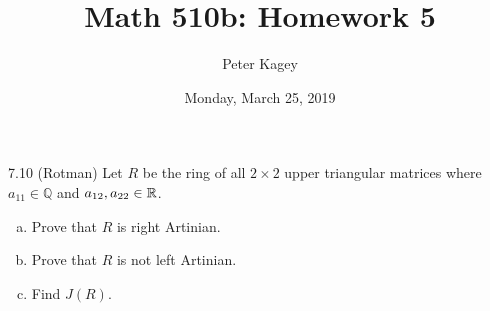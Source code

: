 \documentclass{article}
\begin{document}
\title{Math 510b: Homework 5}
\author{Peter Kagey}
\date{Monday, March 25, 2019}

\maketitle

\begin{problem}{7.10 (Rotman)} %
  Let $R$ be the ring of all $2 \times 2$ upper triangular matrices where $a_{11} \in \mathbb Q$ and $a_{12}, a_{22} \in \mathbb R$.
  \begin{enumerate}[(a)]
    \item Prove that $R$ is right Artinian.
    \item Prove that $R$ is not left Artinian.
    \item Find $J(R)$.  %
  \end{enumerate}
\end{problem}
\end{document}
